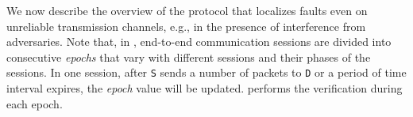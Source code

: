 We now describe the overview of the \name{} protocol that localizes faults even on unreliable transmission channels, e.g., in the presence of interference from adversaries. %
Note that, in \name{}, end-to-end communication sessions are divided into consecutive \emph{epochs} that vary with different sessions and their phases of the sessions. In one session, after {\tt S} sends a number of packets to {\tt D} or a period of time interval expires, the \emph{epoch} value will be updated. \name{} performs the verification during each epoch. 

